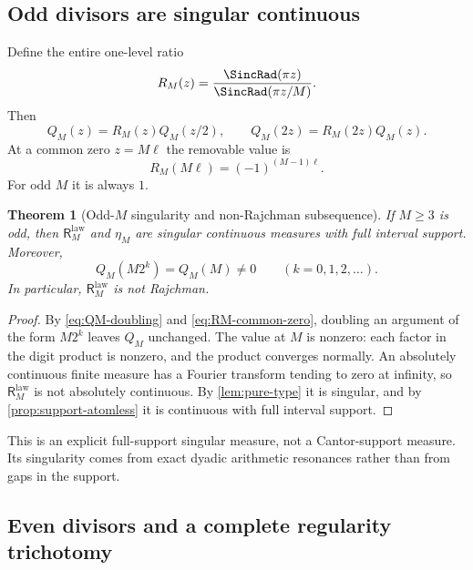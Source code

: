 \documentclass[11pt,oneside]{article}
\newtheorem{theorem}{Theorem}[section]
\theoremstyle{definition}
\theoremstyle{remark}
\newcommand{\ReciprocalIntegerLaw}[1]{\mathsf R^{\mathrm{law}}_{#1}}
\begin{document}
\subsection{Odd divisors are singular continuous}

Define the entire one-level ratio
\begin{equation}
 R_M(z)=\frac{\SincRad(\pi z)}{\SincRad(\pi z/M)}.
 \label{eq:RM}
\end{equation}
Then
\begin{equation}
 Q_M(z)=R_M(z)Q_M(z/2),
 \qquad
 Q_M(2z)=R_M(2z)Q_M(z).
 \label{eq:QM-doubling}
\end{equation}
At a common zero $z=M\ell$ the removable value is
\begin{equation}
 R_M(M\ell)=(-1)^{(M-1)\ell}.
 \label{eq:RM-common-zero}
\end{equation}
For odd $M$ it is always $1$.

\begin{theorem}[Odd-$M$ singularity and non-Rajchman subsequence]
\label{thm:odd-singular}
If $M\ge3$ is odd, then $\ReciprocalIntegerLaw{M}$ and $\eta_M$ are singular continuous measures with
full interval support.  Moreover,
\begin{equation}
 Q_M(M2^k)=Q_M(M)\ne0
 \qquad(k=0,1,2,\ldots).
 \label{eq:nondecay-subsequence}
\end{equation}
In particular, $\ReciprocalIntegerLaw{M}$ is not Rajchman.
\end{theorem}

\begin{proof}
By \eqref{eq:QM-doubling} and \eqref{eq:RM-common-zero}, doubling an argument of the
form $M2^k$ leaves $Q_M$ unchanged.  The value at $M$ is nonzero: each factor in the
digit product is nonzero, and the product converges normally.  An absolutely continuous
finite measure has a Fourier transform tending to zero at infinity, so $\ReciprocalIntegerLaw{M}$ is not
absolutely continuous.  By \cref{lem:pure-type} it is singular, and by
\cref{prop:support-atomless} it is continuous with full interval support.
\end{proof}

This is an explicit full-support singular measure, not a Cantor-support measure.  Its
singularity comes from exact dyadic arithmetic resonances rather than from gaps in the
support.

\subsection{Even divisors and a complete regularity trichotomy}
\end{document}
